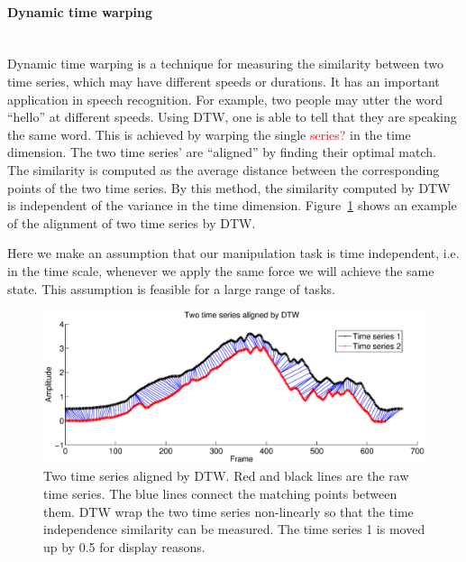 \paragraph{Dynamic time warping} ~\\
Dynamic time warping is a technique for measuring the similarity between two time series, which may have different speeds or durations. It has an important application in speech recognition. For example, two people may utter the word ``hello'' at different speeds. Using DTW, one is able to tell that they are speaking the same word. This is achieved by warping the single \textcolor{red}{series?} in the time dimension. The two time series' are ``aligned'' by finding their optimal match. The similarity is computed as the average distance between the corresponding points of the two time series. By this method, the similarity computed by DTW is independent of the variance in the time dimension. Figure~\ref{fig:alignDTW} shows an example of the alignment of two time series by DTW.

Here we make an assumption that our manipulation task is time independent, i.e. in the time scale, whenever we apply the same force we will achieve the same state. This assumption is feasible for a large range of tasks.

\begin{figure}
  \centering
  \includegraphics[width=16cm]{./fig_cha4/alignDTW.eps}
  \caption{ \scriptsize{Two time series aligned by DTW. Red and black lines are the raw time series. The blue lines connect the matching points between them. DTW wrap the two time series non-linearly so that the time independence similarity can be measured. The time series 1 is moved up by 0.5 for display reasons.}
}
\label{fig:alignDTW}
\end{figure}



